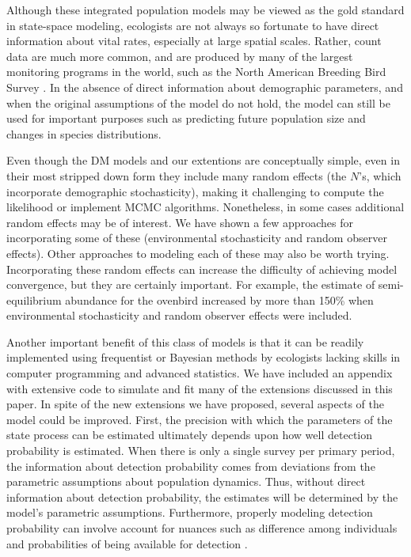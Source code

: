 \documentclass[12pt]{article}
\begin{document}

Although these integrated population models may be viewed as the gold standard in
state-space modeling, ecologists are not always so fortunate to have direct
information about vital rates, especially at large spatial scales.
Rather, count data are much more common, and
are produced by many of the largest monitoring programs in the
world, such as the North American Breeding Bird Survey
\citep[BBS;][]{robbins_etal:1986}.
In the absence of direct information about demographic parameters, and
when the original assumptions of the model do not hold, the
model can still be used for important purposes such as predicting future
population size and changes in species distributions.

Even though the DM models and our extentions are conceptually simple, even in
their most stripped down form they include many random effects (the $N$'s, which
incorporate demographic stochasticity), making it challenging to compute the likelihood 
or implement MCMC algorithms. Nonetheless, in some cases additional random effects
may be of interest.  We have shown a few approaches for incorporating some of these
(environmental stochasticity and random observer effects).  Other approaches to modeling
each of these may also be worth trying.  Incorporating these random effects can increase
the difficulty of achieving model convergence, but they are certainly important.
For example, the estimate of semi-equilibrium abundance for the ovenbird increased by more than 150\%
when environmental stochasticity and random observer effects were included.  

Another important benefit of this class of models is that it can be
readily implemented using frequentist or Bayesian methods by
ecologists lacking skills in computer programming and advanced
statistics. We have included an appendix with extensive code to
simulate and fit many of the extensions discussed in this paper.
In spite of the new extensions we have proposed, several aspects of
the model could be improved. First, the precision with which the
parameters of the state process can be estimated ultimately depends
upon how well detection probability is estimated. When there is
only a single survey per primary period, the information about
detection probability comes from deviations from the parametric
assumptions about population dynamics. Thus, without direct information
about detection probability, the estimates will be determined by the
model's parametric assumptions. Furthermore, properly modeling detection
probability can involve account for nuances such as difference
among individuals and probabilities of being available for detection
\citep{nichols_etal:2009}.
\end{document}
